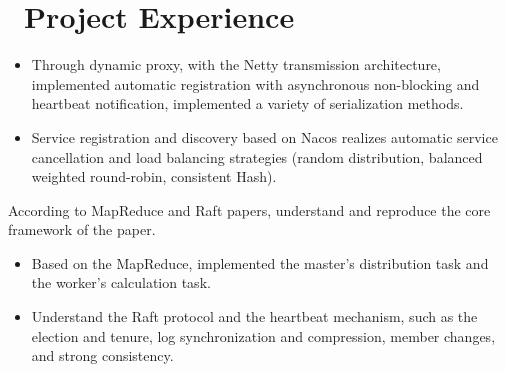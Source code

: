 \documentclass{resume}
\begin{document}
\section{\faUsers\ Project Experience}
\begin{itemize}
  \item Through dynamic proxy, with the Netty transmission architecture, implemented automatic registration with asynchronous non-blocking and heartbeat notification, implemented a variety of serialization methods.
  \item Service registration and discovery based on Nacos realizes automatic service cancellation and load balancing strategies (random distribution, balanced weighted round-robin, consistent Hash).
\end{itemize}
\vspace{-2ex}

According to MapReduce and Raft papers, understand and reproduce the core framework of the paper.
\begin{itemize}
  \item Based on the MapReduce, implemented the master's distribution task and the worker's calculation task.
  \item Understand the Raft protocol and the heartbeat mechanism, such as the election and tenure, log synchronization and compression, member changes, and strong consistency.
\end{itemize}
\vspace{-1ex}


\end{document}

